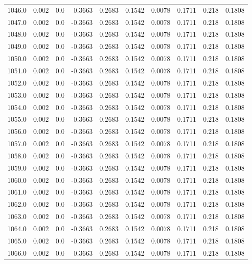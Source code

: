 \begin{longtable}{lrrrrrrrrr}
1046.0 & 0.002 & 0.0 & -0.3663 & 0.2683 & 0.1542 & 0.0078 & 0.1711 & 0.218 & 0.1808 \\
1047.0 & 0.002 & 0.0 & -0.3663 & 0.2683 & 0.1542 & 0.0078 & 0.1711 & 0.218 & 0.1808 \\
1048.0 & 0.002 & 0.0 & -0.3663 & 0.2683 & 0.1542 & 0.0078 & 0.1711 & 0.218 & 0.1808 \\
1049.0 & 0.002 & 0.0 & -0.3663 & 0.2683 & 0.1542 & 0.0078 & 0.1711 & 0.218 & 0.1808 \\
1050.0 & 0.002 & 0.0 & -0.3663 & 0.2683 & 0.1542 & 0.0078 & 0.1711 & 0.218 & 0.1808 \\
1051.0 & 0.002 & 0.0 & -0.3663 & 0.2683 & 0.1542 & 0.0078 & 0.1711 & 0.218 & 0.1808 \\
1052.0 & 0.002 & 0.0 & -0.3663 & 0.2683 & 0.1542 & 0.0078 & 0.1711 & 0.218 & 0.1808 \\
1053.0 & 0.002 & 0.0 & -0.3663 & 0.2683 & 0.1542 & 0.0078 & 0.1711 & 0.218 & 0.1808 \\
1054.0 & 0.002 & 0.0 & -0.3663 & 0.2683 & 0.1542 & 0.0078 & 0.1711 & 0.218 & 0.1808 \\
1055.0 & 0.002 & 0.0 & -0.3663 & 0.2683 & 0.1542 & 0.0078 & 0.1711 & 0.218 & 0.1808 \\
1056.0 & 0.002 & 0.0 & -0.3663 & 0.2683 & 0.1542 & 0.0078 & 0.1711 & 0.218 & 0.1808 \\
1057.0 & 0.002 & 0.0 & -0.3663 & 0.2683 & 0.1542 & 0.0078 & 0.1711 & 0.218 & 0.1808 \\
1058.0 & 0.002 & 0.0 & -0.3663 & 0.2683 & 0.1542 & 0.0078 & 0.1711 & 0.218 & 0.1808 \\
1059.0 & 0.002 & 0.0 & -0.3663 & 0.2683 & 0.1542 & 0.0078 & 0.1711 & 0.218 & 0.1808 \\
1060.0 & 0.002 & 0.0 & -0.3663 & 0.2683 & 0.1542 & 0.0078 & 0.1711 & 0.218 & 0.1808 \\
1061.0 & 0.002 & 0.0 & -0.3663 & 0.2683 & 0.1542 & 0.0078 & 0.1711 & 0.218 & 0.1808 \\
1062.0 & 0.002 & 0.0 & -0.3663 & 0.2683 & 0.1542 & 0.0078 & 0.1711 & 0.218 & 0.1808 \\
1063.0 & 0.002 & 0.0 & -0.3663 & 0.2683 & 0.1542 & 0.0078 & 0.1711 & 0.218 & 0.1808 \\
1064.0 & 0.002 & 0.0 & -0.3663 & 0.2683 & 0.1542 & 0.0078 & 0.1711 & 0.218 & 0.1808 \\
1065.0 & 0.002 & 0.0 & -0.3663 & 0.2683 & 0.1542 & 0.0078 & 0.1711 & 0.218 & 0.1808 \\
1066.0 & 0.002 & 0.0 & -0.3663 & 0.2683 & 0.1542 & 0.0078 & 0.1711 & 0.218 & 0.1808 \\

\end{longtable}
